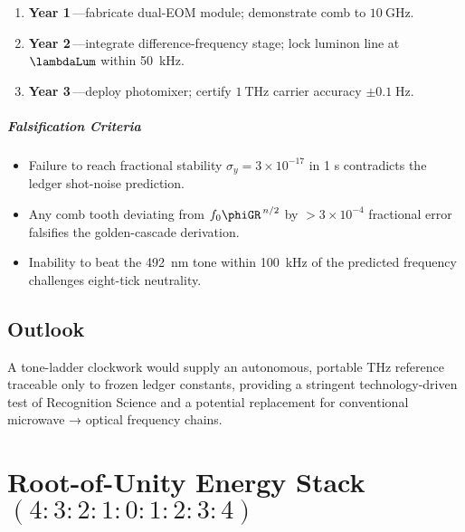 \documentclass[11pt,oneside]{book}
\begin{document}
{\begin{enumerate}[leftmargin=*,itemsep=4pt]
\item \textbf{Year 1}\,—fabricate dual-EOM module;
      demonstrate comb to \(\SI{10}{\giga\hertz}\).
\item \textbf{Year 2}\,—integrate difference-frequency stage;
      lock luminon line at \(\lambdaLum\) within \SI{50}{\kilo\hertz}.
\item \textbf{Year 3}\,—deploy photomixer;
      certify \(\SI{1}{\tera\hertz}\) carrier accuracy
      $\pm0.1\;\text{Hz}$.
\end{enumerate}

\paragraph{Falsification Criteria}

\begin{itemize}\setlength\itemsep=4pt]
\item Failure to reach fractional stability
      \(\sigma_{y}=3\times10^{-17}\)
      in 1 s contradicts the ledger shot-noise prediction.
\item Any comb tooth deviating from
      \(f_{0}\phiGR^{\,n/2}\)
      by $>3\times10^{-4}$ fractional error falsifies the
      golden-cascade derivation.
\item Inability to beat the \SI{492}{\nano\metre} tone within
      \SI{100}{\kilo\hertz} of the predicted frequency
      challenges eight-tick neutrality.
\end{itemize}

\section*{Outlook}

A tone-ladder clockwork would supply an autonomous,
portable THz reference traceable only to frozen ledger constants,
providing a stringent technology-driven test of Recognition Science
and a potential replacement for conventional microwave →
optical frequency chains.

\chapter{Root-of-Unity Energy Stack
         \texorpdfstring{$(4{:}3{:}2{:}1{:}0{:}1{:}2{:}3{:}4)$}{(4:3:2:1:0:1:2:3:4)}}
\label{sec:root-unity-intro}

}
\end{document}

